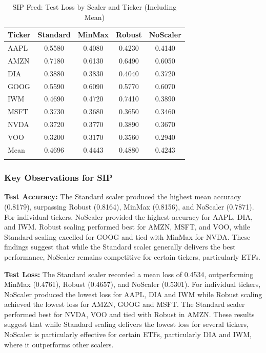 \documentclass[letterpaper]{article}
\begin{document}
\begin{table}[H]
  \centering
  \caption{SIP Feed: Test Loss by Scaler and Ticker (Including Mean)}
  \begin{tabular}{lcccc}
  \toprule
  \textbf{Ticker} & \textbf{Standard} & \textbf{MinMax} & \textbf{Robust} & \textbf{NoScaler} \\ 
  \midrule
  AAPL & 0.5580 & \cellcolor{blue!30} 0.4080 & 0.4230 & 0.4140 \\ 
  AMZN & 0.7180 & 0.6130 & 0.6490 & \cellcolor{blue!30} 0.6050 \\
  DIA  & 0.3880 & 0.3830 & 0.4040 & \cellcolor{blue!30} 0.3720 \\ 
  GOOG & \cellcolor{blue!30} 0.5590 & 0.6090 & 0.5770 & 0.6070 \\ 
  IWM  & 0.4690 & 0.4720 & 0.7410 & \cellcolor{blue!30}0.3890 \\ 
  MSFT & 0.3730 & 0.3680 & 0.3650 & \cellcolor{blue!30} 0.3460 \\ 
  NVDA & 0.3720 & 0.3770 & 0.3890 & \cellcolor{blue!30} 0.3670 \\ 
  VOO  & 0.3200 & 0.3170 & 0.3560 & \cellcolor{blue!30} 0.2940 \\ 
  \midrule
  Mean & 0.4696 & 0.4443 & 0.4880 & \cellcolor{blue!30} 0.4243 \\
  \bottomrule
  \label{tab:sip_loss}
  \end{tabular}
  \end{table}

\subsubsection*{Key Observations for SIP}

\textbf{Test Accuracy:} The Standard scaler produced the highest mean accuracy (0.8179), surpassing Robust (0.8164), MinMax (0.8156), and NoScaler (0.7871). For individual tickers, NoScaler provided the highest accuracy for AAPL, DIA, and IWM. Robust scaling performed best for AMZN, MSFT, and VOO, while Standard scaling excelled for GOOG and tied with MinMax for NVDA. These findings suggest that while the Standard scaler generally delivers the best performance, NoScaler remains competitive for certain tickers, particularly ETFs.

\textbf{Test Loss:} The Standard scaler recorded a mean loss of 0.4534, outperforming MinMax (0.4761), Robust (0.4657), and NoScaler (0.5301). For individual tickers, NoScaler produced the lowest loss for AAPL, DIA and IWM while Robust scaling achieved the lowest loss for AMZN, GOOG and MSFT. The Standard scaler performed best for NVDA, VOO and tied with Robust in AMZN. These results suggest that while Standard scaling delivers the lowest loss for several tickers, NoScaler is particularly effective for certain ETFs, particularly DIA and IWM, where it outperforms other scalers.
\end{document}
